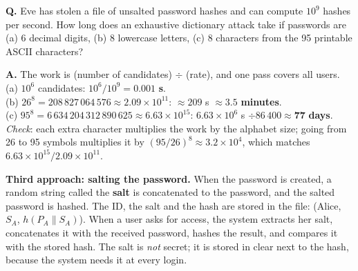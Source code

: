 \begin{worked}
\textbf{Q.} Eve has stolen a file of unsalted password hashes and can compute $10^9$ hashes per second. How long does an exhaustive dictionary attack take if passwords are (a) 6 decimal digits, (b) 8 lowercase letters, (c) 8 characters from the 95 printable ASCII characters?

\textbf{A.} The work is (number of candidates) $\div$ (rate), and one pass covers all users.\\
(a) $10^6$ candidates: $10^6 / 10^9 = \mathbf{0.001}$ \textbf{s}.\\
(b) $26^8 = 208\,827\,064\,576 \approx 2.09 \times 10^{11}$: $\approx 209$ s $\approx \mathbf{3.5}$ \textbf{minutes}.\\
(c) $95^8 = 6\,634\,204\,312\,890\,625 \approx 6.63 \times 10^{15}$: $6.63 \times 10^{6}$ s $\div 86\,400 \approx \mathbf{77}$ \textbf{days}.\\
\emph{Check}: each extra character multiplies the work by the alphabet size; going from 26 to 95 symbols multiplies it by $(95/26)^8 \approx 3.2 \times 10^4$, which matches $6.63 \times 10^{15} / 2.09 \times 10^{11}$.
\end{worked}

\textbf{Third approach: salting the password.} When the password is created, a random string called the \textbf{salt} is concatenated to the password, and the salted password is hashed. The ID, the salt and the hash are stored in the file: (Alice, $S_A$, $h(P_A \| S_A)$). When a user asks for access, the system extracts her salt, concatenates it with the received password, hashes the result, and compares it with the stored hash. The salt is \emph{not} secret; it is stored in clear next to the hash, because the system needs it at every login.


